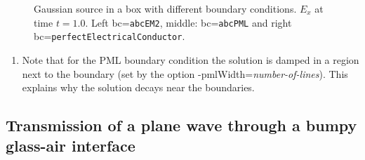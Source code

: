 \documentclass{article}
\begin{document}
{
\begin{figure}[hbt]
\newcommand{\figWidth}{5.5cm}
\newcommand{\trimfig}[2]{\trimFig{#1}{#2}{0.1}{0.05}{.05}{.05}}
\begin{center}
\end{center}
\caption{Gaussian source in a box with different boundary conditions. $E_x$ at time $t=1.0$. Left bc={\tt abcEM2}, middle: bc={\tt abcPML} and
right bc={\tt perfectElectricalConductor}. }
\label{fig:rbcBox}
\end{figure}
}

\begin{enumerate}
 \item Note that for the PML boundary condition the solution is damped in a region 
  next to the boundary (set by the option -pmlWidth={\em number-of-lines}). This explains why the solution decays near the boundaries.
\end{enumerate}


\clearpage
\subsection{Transmission of a plane wave through a bumpy glass-air interface} \label{sec:scatBump2d}
\end{document}
